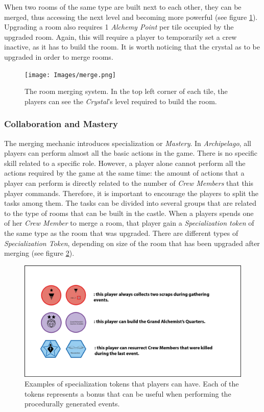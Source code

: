When two rooms of the same type are built next to each other, they can be merged, thus accessing the next level and becoming more powerful (see figure \ref{fig:merge}). Upgrading a room also requires 1 \textit{Alchemy Point} per tile occupied by the upgraded room. Again, this will require a player to temporarily set a crew inactive, as it has to build the room. It is worth noticing that the crystal as to be upgraded in order to merge rooms.

\begin{figure}[!ht]
    \centering
    \texttt{[image: Images/merge.png]}
    \caption{The room merging system. In the top left corner of each tile, the players can see the \textit{Crystal}'s level required to build the room.} 
    \label{fig:merge}
\end{figure}
\subsubsection{Collaboration and Mastery}
The merging mechanic introduces specialization or \textit{Mastery}. In \textit{Archipelago}, all players can perform almost all the basic actions in the game. There is no specific skill related to a specific role. However, a player alone cannot perform all the actions required by the game at the same time: the amount of actions that a player can perform is directly related to the number of \textit{Crew Members} that this player commands. Therefore, it is important to encourage the players to split the tasks among them. The tasks can be divided into several groups that are related to the type of rooms that can be built in the castle. When a players spends one of her \textit{Crew Member} to merge a room, that player gain a \textit{Specialization token} of the same type as the room that was upgraded. There are different types of \textit{Specialization Token}, depending on size of the room that has been upgraded after merging (see figure \ref{fig:spec}). 

\begin{figure}[!ht]
    \centering
    \includegraphics[width=\textwidth]{Images/Specialization.png}
    \caption{Examples of specialization tokens that players can have. Each of the tokens represents a bonus that can be useful when performing the procedurally generated events.}
    \label{fig:spec}
\end{figure}

